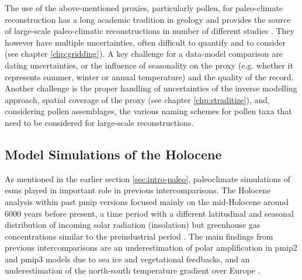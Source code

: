 \begin{refsection}
The use of the above-mentioned proxies, particularly pollen, for paleo-climate reconstruction has a long academic tradition in geology \citep{Bradley1985} and provides the source of large-scale paleo-climatic reconstructions in number of different studies \citep{MauriDavisCollinsEtAl2015, DavisBrewerStevensonEtAl2003, MarsicekShumanBartleinEtAl2018, NeukomSteigerGomezNavarroEtAl2019, NeukomBarbozaErbEtAl2019}. They however have multiple uncertainties, often difficult to quantify and to consider (see chapter \ref{chp:gridding}). A key challenge for a data-model comparison are dating uncertainties, or the influence of seasonality on the proxy (e.g. whether it represents summer, winter or annual temperature) and the quality of the record. Another challenge is the proper handling of uncertainties of the inverse modelling approach, spatial coverage of the proxy (see chapter \ref{chp:straditize}), and, considering pollen assemblages, the various naming schemes for pollen taxa that need to be considered for large-scale reconstructions.


\subsection{Model Simulations of the Holocene}  \label{sec:intro-paleo-model}
As mentioned in the earlier section \ref{sec:intro-paleo}, paleoclimate simulations of \glspl{esm} played in important role in previous intercomparisons. The Holocene analysis within past \gls{pmip} versions focused mainly on the mid-Holocene around 6000 years before present, a time period with a different latitudinal and seasonal distribution of incoming solar radiation (insolation) but greenhouse gas concentrations similar to the preindustrial period \citep{Otto-BliesnerBraconnotHarrisonEtAl2017}. The main findings from previous intercomparisons are an underestimation of polar amplification in \gls{pmip}2 and \gls{pmip}3 models due to sea ice and vegetational feedbacks, and an underestimation of the north-south temperature gradient over Europe \citep{ClimateChange2014a, MassonDelmotteKageyamaBraconnotEtAl2006, ZhangSundqvistMobergEtAl2010, BrewerGuiotTorre2007, DavisBrewer2009}.


\end{refsection}
